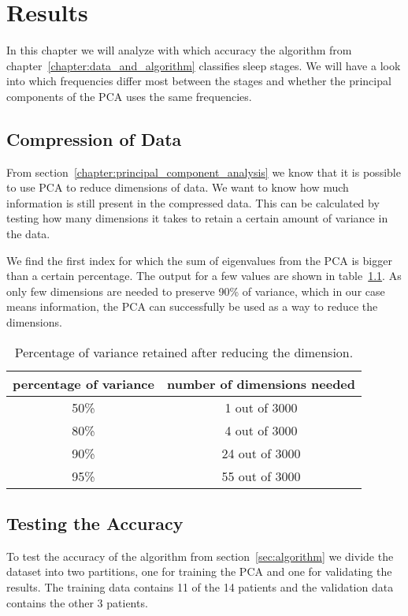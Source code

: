 \chapter{Results}
\label{chapter:results}

In this chapter we will analyze with which accuracy the algorithm from chapter~\ref{chapter:data_and_algorithm} classifies sleep stages. We will have a look into which frequencies differ most between the stages and whether the principal components of the PCA uses the same frequencies.

\section{Compression of Data}
From section~\ref{chapter:principal_component_analysis} we know that it is possible to use PCA to reduce dimensions of data. We want to know how much information is still present in the compressed data. This can be calculated by testing how many dimensions it takes to retain a certain amount of variance in the data.

We find the first index for which the sum of eigenvalues from the PCA is bigger than a certain percentage. The output for a few values are shown in table~\ref{tab:explained_variance}. As only few dimensions are needed to preserve 90\% of variance, which in our case means information, the PCA can successfully be used as a way to reduce the dimensions.

\begin{table}
	\centering
	\begin{tabular}{c|c}
		percentage of variance & number of dimensions needed \\
		\hline
		50\% & 1 out of 3000 \\
		80\% & 4 out of 3000 \\
		90\% & 24 out of 3000 \\
		95\% & 55 out of 3000 \\
	\end{tabular}
	\caption{Percentage of variance retained after reducing the dimension.}
	\label{tab:explained_variance}
\end{table}

\section{Testing the Accuracy}
To test the accuracy of the algorithm from section~\ref{sec:algorithm} we divide the dataset into two partitions, one for training the PCA and one for validating the results. The training data contains 11 of the 14 patients and the validation data contains the other 3 patients.

